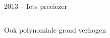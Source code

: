 \documentclass{beamer}
\begin{document}
\begin{frame}{2013 -- Iets preciezer}
\begin{columns}[t]
\begin{column}[T]{2.5cm}
\end{column}
\end{columns}
\end{frame}

\begin{frame}{Ook polynomiale graad verhogen}
  \centering

\end{frame}
\end{document}
